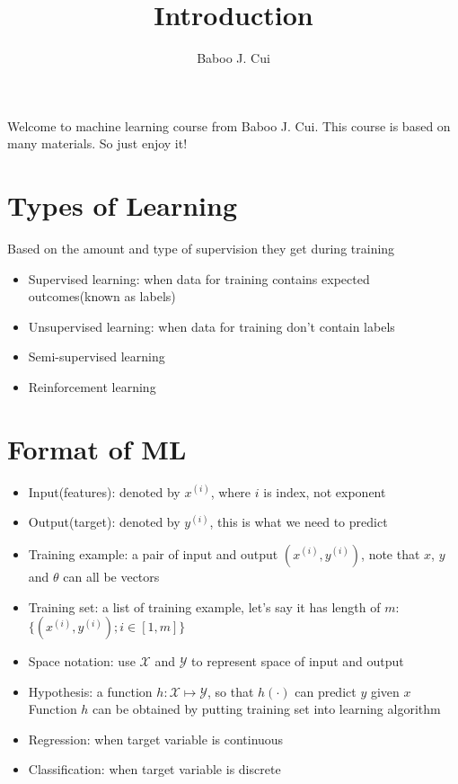 \documentclass[10pt,a4paper,oneside]{article}
\author{Baboo J. Cui}
\begin{document}
\title{Introduction}
\maketitle

Welcome to machine learning course from Baboo J. Cui. This course is based on many materials. So just enjoy it!

\section{Types of Learning}
Based on the amount and type of supervision they get during training
\begin{itemize}
	\item Supervised learning: when data for training contains expected outcomes(known as labels)
	\item Unsupervised learning: when data for training don't contain labels
	\item Semi-supervised learning
	\item Reinforcement learning
\end{itemize}

\section{Format of ML}
\begin{itemize}
	\item Input(features): denoted by $x^{(i)}$, where $i$ is index, not exponent
	\item Output(target): denoted by $y^{(i)}$, this is what we need to predict
	\item Training example: a pair of input and output $(x^{(i)}, y^{(i)})$, note that $x$, $y$  and $\theta$ can all be vectors
	\item Training set: a list of training example, let's say it has length of $m$: $\{(x^{(i)}, y^{(i)}); i \in [1,m]\}$
	\item Space notation: use $\mathcal{X}$ and $\mathcal{Y}$ to represent space of input and output
	\item Hypothesis: a function $h:\mathcal{X} \mapsto \mathcal{Y}$, so that $h(\cdot)$ can predict $y$ given $x$ Function $h$ can be obtained by putting training set into learning algorithm
	\item Regression: when target variable is continuous
	\item Classification: when target variable is discrete
\end{itemize}
\end{document}
